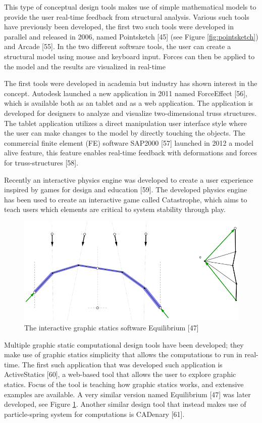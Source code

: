 This type of conceptual design tools makes use of simple mathematical models to provide the user real-time feedback from structural analysis. Various such tools have previously been developed, the first two such tools were developed in parallel and released in 2006, named Pointsketch [45] (see Figure \ref{fig:pointsketch}) and Arcade [55]. In the two different software tools, the user can create a structural model using mouse and keyboard input. Forces can then be applied to the model and the results are visualized in real-time 

The first tools were developed in academia but industry has shown interest in the concept. Autodesk launched a new application in 2011 named ForceEffect [56], which is available both as an tablet and as a web application. The application is developed for designers to analyze and visualize two-dimensional truss structures. The tablet application utilizes a direct manipulation user interface style where the user can make changes to the model by directly touching the objects. The commercial finite element (FE) software SAP2000 [57] launched in 2012 a model alive feature, this feature enables real-time feedback with deformations and forces for truss-structures [58].

Recently an interactive physics engine was developed to create a user experience inspired by games for design and education [59]. The developed physics engine has been used to create an interactive game called Catastrophe, which aims to teach users which elements are critical to system stability through play.

\begin{figure}
  \includegraphics[width=330pt]{graphics/equilibrium.png}
  \caption{The interactive graphic statics software Equilibrium [47]}
  \label{fig:equilibrium}
\end{figure}

Multiple graphic static computational design tools have been developed; they make use of graphic statics simplicity that allows the computations to run in real-time. The first such application that was developed such application is ActiveStatics [60], a web-based tool that allows the user to explore graphic statics. Focus of the tool is teaching how graphic statics works, and extensive examples are available. A very similar version named Equilibrium [47] was later developed, see Figure \ref{fig:equilibrium}. Another similar design tool that instead makes use of particle-spring system for computations is CADenary [61].



